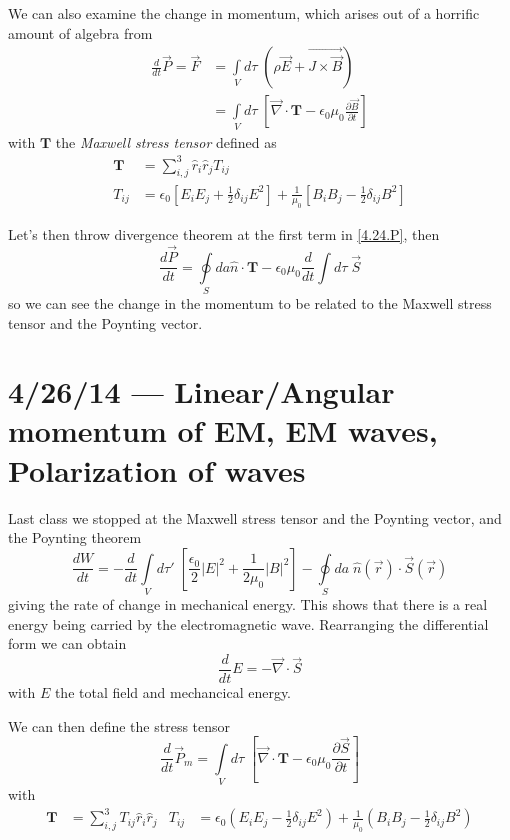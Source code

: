 \documentclass[10pt]{report}
\newcommand{\rd}[2]{\frac{d#1}{d#2}}
\newcommand{\pd}[2]{\frac{\partial #1}{\partial#2}}
\newcommand{\abs}[1]{\left|#1\right|}
\begin{document}
We can also examine the change in momentum, which arises out of a horrific amount of algebra from
\begin{align}
    \rd{}{t}\vec{P} = \vec{F} &= \int\limits_{V}^{}d\tau\;\left( \rho \vec{E} + \vec{J \times \vec{B}} \right)\\
    &= \int\limits_{V}^{}d\tau\;\left[ \vec{\nabla} \cdot \mathbf{T} - \epsilon_0\mu_0\pd{\vec{B}}{t} \right]\label{4.24.P}
\end{align}
with $\mathbf{T}$ the \emph{Maxwell stress tensor} defined as 
\begin{align}
    \mathbf{T} &= \sum_{i,j}^{3}\hat{r}_i\hat{r}_jT_{ij}\\
    T_{ij} &= \epsilon_0\left[ E_iE_j + \frac{1}{2}\delta_{ij}E^2 \right] + \frac{1}{\mu_0}\left[ B_iB_j - \frac{1}{2}\delta_{ij}B^2 \right]
\end{align}

Let's then throw divergence theorem at the first term in \eqref{4.24.P}, then
\begin{equation}
    \rd{\vec{P}}{t} = \oint\limits_S da\hat{n} \cdot \mathbf{T} - \epsilon_0\mu_0 \rd{}{t}\int\limits_{}^{}d\tau\;\vec{S}
\end{equation}
so we can see the change in the momentum to be related to the Maxwell stress tensor and the Poynting vector. 
\chapter{4/26/14 --- Linear/Angular momentum of EM, EM waves, Polarization of waves}

Last class we stopped at the Maxwell stress tensor and the Poynting vector, and the Poynting theorem
\begin{equation}
    \rd{W}{t} = -\rd{}{t}\int\limits_{V}^{}d\tau'\;\left[ \frac{\epsilon_0}{2}\abs{E}^2 + \frac{1}{2\mu_0}\abs{B}^2\right] - \oint\limits_S da \; \hat{n}(\vec{r}) \cdot \vec{S}(\vec{r})
\end{equation}
giving the rate of change in mechanical energy. This shows that there is a real energy being carried by the electromagnetic wave. Rearranging the differential form we can obtain
\begin{equation}
    \rd{}{t} E = -\vec{\nabla} \cdot \vec{S}
\end{equation}
with $E$ the total field and mechancical energy. 

We can then define the stress tensor
\begin{equation}
    \rd{}{t}\vec{P}_{m} = \int\limits_{V}^{}d\tau\;\left[ \vec{\nabla} \cdot \mathbf{T} - \epsilon_0\mu_0\pd{\vec{S}}{t} \right]\label{4.26.stress}
\end{equation}
with 
\begin{align}
    \mathbf{T} &= \sum_{i,j}^{3}T_{ij}\hat{r}_i \hat{r}_j & T_{ij} &= \epsilon_0\left( E_iE_j - \frac{1}{2}\delta_{ij}E^2 \right) + \frac{1}{\mu_0}\left( B_i B_j - \frac{1}{2}\delta_{ij}B^2 \right)
\end{align}
\end{document}
